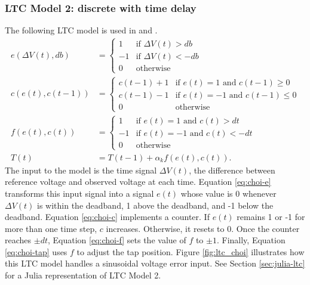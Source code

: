 \documentclass[10pt,letterpaper]{article}
\begin{document}
\subsubsection{LTC Model 2: discrete with time delay}
The following LTC model is used in \cite{choi2009} and \cite{park2007}.
\begin{subequations}\label{eq:choi-ltc}
\begin{align}
    \label{eq:choi-e} e(\Delta V(t),db) &=
    \begin{cases}
        1 & \mbox{if } \Delta V(t) > db \\
        -1 & \mbox{if } \Delta V(t) < -db \\
        0 & \mbox{otherwise}
        \end{cases} \\
    \label{eq:choi-c}c(e(t),c(t-1)) &=
    \begin{cases}
        c(t-1) + 1 & \mbox{if } e(t) = 1 \mbox{ and } c(t-1) \geq 0 \\
        c(t-1) - 1 & \mbox{if } e(t) = -1 \mbox{ and } c(t-1) \leq 0 \\
        0 & \mbox{otherwise}
        \end{cases} \\
    \label{eq:choi-f}f(e(t),c(t)) &=
    \begin{cases}
        1 & \mbox{if } e(t) = 1 \mbox{ and } c(t) > dt \\
        -1 & \mbox{if } e(t) = -1 \mbox{ and } c(t) < -dt \\
        0 & \mbox{otherwise}
        \end{cases} \\
    \label{eq:choi-tap} T(t) &= T(t-1) + \alpha_k f(e(t),c(t)).
\end{align}
\end{subequations}
The input to the model is the time signal $\Delta V(t)$, the difference between reference voltage and observed voltage at each time. Equation \eqref{eq:choi-e} transforms this input signal into a signal $e(t)$ whose value is 0 whenever $\Delta V(t)$ is within the deadband, 1 above the deadband, and -1 below the deadband. Equation \eqref{eq:choi-c} implements a counter. If $e(t)$ remains 1 or -1 for more than one time step, $c$ increases. Otherwise, it resets to 0. Once the counter reaches $\pm dt$, Equation \eqref{eq:choi-f} sets the value of $f$ to $\pm 1$. Finally, Equation \eqref{eq:choi-tap} uses $f$ to adjust the tap position. Figure \ref{fig:ltc_choi} illustrates how this LTC model handles a sinusoidal voltage error input. See Section \ref{sec:julia-ltc} for a Julia representation of LTC Model 2.
\end{document}
